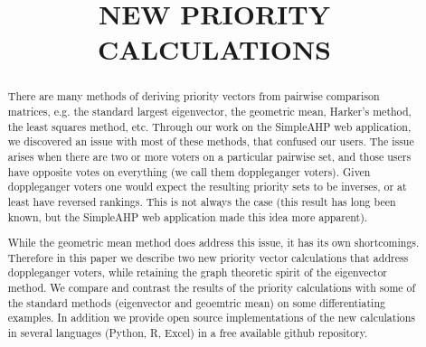 \documentclass[11pt]{article}
\title{NEW PRIORITY CALCULATIONS}
\renewcommand{\maketitle}{\begin{center}{\Large \textbf{\thetitle}} \end{center}}
\begin{document}
\maketitle
\thispagestyle{fancy}

\begin{abstract}
There are many methods of deriving priority vectors from pairwise comparison
matrices, e.g. the standard largest eigenvector, the geometric mean, Harker's
method, the least squares method, etc.  Through our work on the SimpleAHP
web application, we discovered an issue with most of these methods, that
confused our users.  The issue arises when there are two or more voters
on a particular pairwise set, and those users have opposite votes on everything
(we call them doppleganger voters).  Given doppleganger voters one would
expect the resulting priority sets to be inverses, or at least have reversed
rankings.  This is not always the case (this result has long been known, but
the SimpleAHP web application made this idea more apparent).

While the geometric mean method does address this issue, it has its own
shortcomings.  Therefore in this paper we describe two new priority vector
calculations that address doppleganger voters, while retaining the graph
theoretic spirit of the eigenvector method.  We compare and contrast the
results of the priority calculations with some of the standard methods
(eigenvector and geoemtric mean) on some differentiating examples.
In addition we provide open source implementations of the new calculations in
several languages (Python, R, Excel) in a free available github repository.  \end{abstract}

\end{document}
